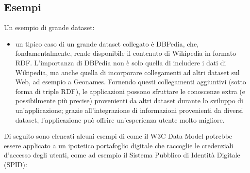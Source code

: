\subsection{Esempi}
Un esempio di grande dataset:
\begin{itemize}
    \item un tipico caso di un grande dataset collegato è DBPedia, che, fondamentalmente, rende disponibile il contenuto di Wikipedia in formato RDF. L'importanza di DBPedia non è solo quella di includere i dati di Wikipedia, ma anche quella di incorporare collegamenti ad altri dataset sul Web, ad esempio a Geonames. Fornendo questi collegamenti aggiuntivi (sotto forma di triple RDF), le applicazioni possono sfruttare le conoscenze extra (e possibilmente più precise) provenienti da altri dataset durante lo sviluppo di un'applicazione; grazie all'integrazione di informazioni provenienti da diversi dataset, l'applicazione può offrire un'esperienza utente molto migliore.
\end{itemize}
Di seguito sono elencati alcuni esempi di come il W3C Data Model potrebbe essere applicato a un ipotetico portafoglio digitale che raccoglie le credenziali d'accesso degli utenti, come ad esempio il Sistema Pubblico di Identità Digitale (SPID):
